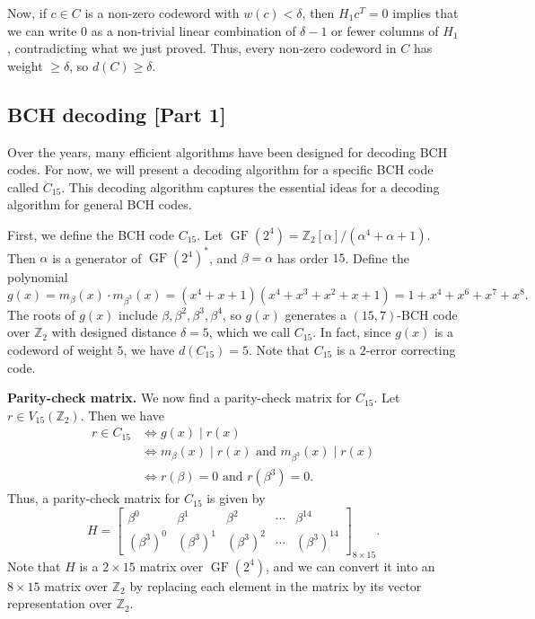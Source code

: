 \documentclass[10pt]{article}
\makeatletter
\newcommand{\Z}{\mathbb{Z}}
\DeclareMathOperator{\GF}{GF}
\theoremstyle{newstyle}
\newenvironment{pf}[1][\proofname]{\par
  \pushQED{\qed}%
  \normalfont \topsep0\p@\relax
  \trivlist
  \item[\hskip\labelsep\scshape
  #1\@addpunct{.}]\ignorespaces
}{%
  \popQED\endtrivlist\@endpefalse
}
\makeatother
\begin{document}
\begin{pf}
Now, if $c \in C$ is a non-zero codeword with $w(c) < \delta$, then $H_1c^T = 0$ implies that we can write 
$0$ as a non-trivial linear combination of $\delta-1$ or fewer columns of $H_1$, contradicting what 
we just proved. Thus, every non-zero codeword in $C$ has weight $\geq \delta$, so 
$d(C) \geq \delta$. 
\end{pf}

\subsection{BCH decoding [Part 1]}

Over the years, many efficient algorithms have been designed for decoding BCH codes. For now, 
we will present a decoding algorithm for a specific BCH code called $C_{15}$. This decoding 
algorithm captures the essential ideas for a decoding algorithm for general BCH codes. 

First, we define the BCH code $C_{15}$. Let $\GF(2^4) = \Z_2[\alpha]/(\alpha^4 + \alpha + 1)$. 
Then $\alpha$ is a generator of $\GF(2^4)^*$, and $\beta = \alpha$ has order $15$. Define the polynomial 
\[ g(x) = m_\beta(x) \cdot m_{\beta^3}(x) = (x^4+x+1)(x^4+x^3+x^2+x+1) = 1+x^4+x^6+x^7+x^8. \]
The roots of $g(x)$ include $\beta, \beta^2, \beta^3, \beta^4$, so $g(x)$ generates a 
$(15, 7)$-BCH code over $\Z_2$ with designed distance $\delta = 5$, which we call $C_{15}$. 
In fact, since $g(x)$ is a codeword of weight $5$, we have $d(C_{15}) = 5$. Note that 
$C_{15}$ is a $2$-error correcting code. 

{\bf Parity-check matrix.} We now find a parity-check matrix for $C_{15}$. Let $r \in V_{15}(\Z_2)$. 
Then we have 
\begin{align*}
    r \in C_{15} &\iff g(x) \mid r(x) \\
    &\iff m_\beta(x) \mid r(x) \text{ and } m_{\beta^3}(x) \mid r(x) \\
    &\iff r(\beta) = 0 \text{ and } r(\beta^3) = 0. 
\end{align*}
Thus, a parity-check matrix for $C_{15}$ is given by 
\[ H = \begin{bmatrix} \beta^0 & \beta^1 & \beta^2 & \cdots & \beta^{14} \\ 
(\beta^3)^0 & (\beta^3)^1 & (\beta^3)^2 & \cdots & (\beta^3)^{14} \end{bmatrix}_{8 \times 15}. \]
Note that $H$ is a $2 \times 15$ matrix over $\GF(2^4)$, and we can convert it into an 
$8 \times 15$ matrix over $\Z_2$ by replacing each element in the matrix by its vector 
representation over $\Z_2$. 
\end{document}
